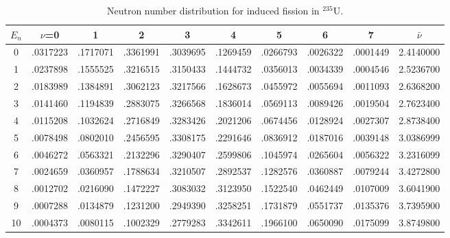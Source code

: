 \documentclass[11pt]{article}
\begin{document}
\begin{table}[ht]
\footnotesize
\begin{center}
\begin{tabular}{|c|cccccccc|c|} \hline
$E_n$ & $\nu$=0 & 1 & 2 & 3 & 4 & 5 & 6 & 7 & $\bar{\nu}$ \\ \hline
0 & .0317223 & .1717071 & .3361991 & .3039695 & .1269459 & .0266793 & .0026322 & .0001449 & 2.4140000 \\
1 & .0237898 & .1555525 & .3216515 & .3150433 & .1444732 & .0356013 & .0034339 & .0004546 & 2.5236700 \\
2 & .0183989 & .1384891 & .3062123 & .3217566 & .1628673 & .0455972 & .0055694 & .0011093 & 2.6368200 \\
3 & .0141460 & .1194839 & .2883075 & .3266568 & .1836014 & .0569113 & .0089426 & .0019504 & 2.7623400 \\
4 & .0115208 & .1032624 & .2716849 & .3283426 & .2021206 & .0674456 & .0128924 & .0027307 & 2.8738400 \\
5 & .0078498 & .0802010 & .2456595 & .3308175 & .2291646 & .0836912 & .0187016 & .0039148 & 3.0386999 \\
6 & .0046272 & .0563321 & .2132296 & .3290407 & .2599806 & .1045974 & .0265604 & .0056322 & 3.2316099 \\
7 & .0024659 & .0360957 & .1788634 & .3210507 & .2892537 & .1282576 & .0360887 & .0079244 & 3.4272800 \\
8 & .0012702 & .0216090 & .1472227 & .3083032 & .3123950 & .1522540 & .0462449 & .0107009 & 3.6041900 \\
9 & .0007288 & .0134879 & .1231200 & .2949390 & .3258251 & .1731879 & .0551737 & .0135376 & 3.7395900 \\
10& .0004373 & .0080115 & .1002329 & .2779283 & .3342611 & .1966100 & .0650090 & .0175099 & 3.8749800 \\ \hline
\end{tabular}
\end{center}
\caption{Neutron number distribution for induced fission in $^{235}$U.}
\label{Neutron number distribution for induced fission in 235U}
\end{table}
\end{document}
